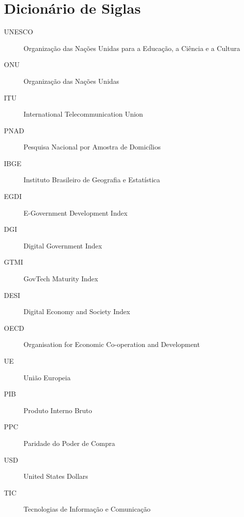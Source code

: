 \chapter*{Dicionário de Siglas}

\begin{description}
    \item[UNESCO] Organização das Nações Unidas para a Educação, a Ciência e a Cultura
    \item[ONU] Organização das Nações Unidas
    \item[ITU] International Telecommunication Union
    \item[PNAD] Pesquisa Nacional por Amostra de Domicílios
    \item[IBGE] Instituto Brasileiro de Geografia e Estatística
    \item[EGDI] E-Government Development Index
    \item[DGI] Digital Government Index  
    \item[GTMI] GovTech Maturity Index
    \item[DESI] Digital Economy and Society Index 
    \item[OECD] Organisation for Economic Co-operation and Development
    \item[UE] União Europeia 
    \item[PIB] Produto Interno Bruto 
    \item[PPC] Paridade do Poder de Compra 
    \item[USD] United States Dollars
    \item[TIC] Tecnologias de Informação e Comunicação
\end{description}